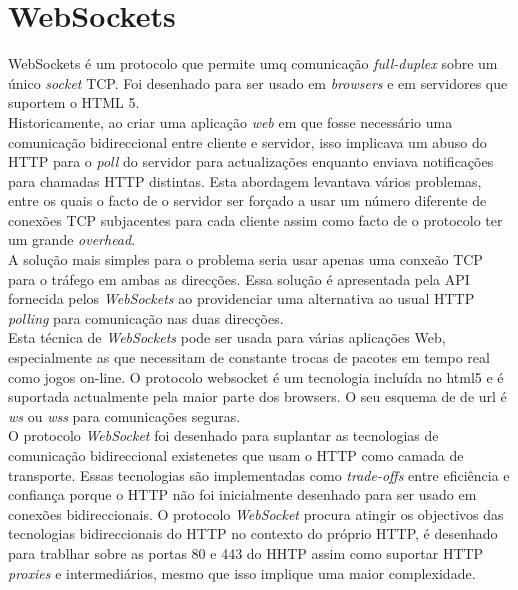 \section{WebSockets}
WebSockets é um protocolo que permite umq comunicação \textit{full-duplex} sobre um único \textit{socket} TCP. Foi desenhado para ser usado em \textit{browsers} e em servidores que suportem o HTML 5.\\
Historicamente, ao criar uma aplicação \textit{web} em que fosse necessário uma comunicação bidireccional entre cliente e servidor, isso implicava um abuso do HTTP para o \textit{poll} do servidor para actualizações enquanto enviava notificações para chamadas HTTP distintas. Esta abordagem levantava vários problemas, entre os quais o facto de o servidor ser forçado a usar um número diferente de conexões TCP subjacentes para cada cliente assim como facto de o protocolo ter um grande \textit{overhead}.\\
A solução mais simples para o problema seria usar apenas uma conxeão TCP para o tráfego em ambas as direcções. Essa solução é apresentada pela API fornecida pelos \textit{WebSockets} ao providenciar uma alternativa ao usual HTTP \textit{polling} para comunicação nas duas direcções.\\
Esta técnica de \textit{WebSockets} pode ser usada para várias aplicações Web, especialmente as que necessitam de constante trocas de pacotes em tempo real como jogos on-line. O protocolo websocket é um tecnologia incluída no html5 e é suportada actualmente pela maior parte dos browsers. O seu esquema de de url é \textit{ws} ou \textit{wss} para comunicações seguras. \\
O protocolo \textit{WebSocket} foi desenhado para suplantar as tecnologias de comunicação bidireccional existenetes que usam o HTTP como camada  de transporte. Essas tecnologias são implementadas como \textit{trade-offs} entre eficiência e confiança porque o HTTP não foi inicialmente desenhado para ser usado em conexões bidireccionais. O protocolo \textit{WebSocket} procura atingir os objectivos das tecnologias bidireccionais do HTTP no contexto do próprio HTTP, é desenhado para trablhar sobre as portas 80 e 443 do HHTP assim como suportar HTTP \textit{proxies} e intermediários, mesmo que isso implique uma maior complexidade.\\
